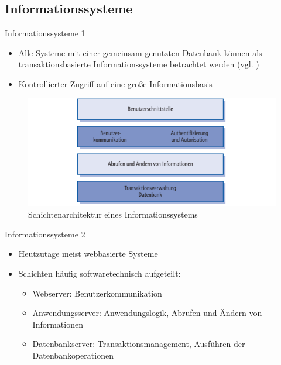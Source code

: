 \documentclass{beamer}
\begin{document}
		\subsection{Informationssysteme}
			\begin{frame}{Informationssysteme 1}
			\begin{itemize}
				\item Alle Systeme mit einer gemeinsam genutzten Datenbank können als transaktionsbasierte Informationssysteme betrachtet werden (vgl. \cite[S. 205]{sommer})
				\item Kontrollierter Zugriff auf eine große Informationsbasis
			\end{itemize}
			\begin{figure}
				\includegraphics[width=\textwidth]{informationssystem-1.png}
				\caption{Schichtenarchitektur eines Informationssystems \cite[S. 205]{sommer}}
			\end{figure}
			\end{frame}
		
			\begin{frame}{Informationssysteme 2}
			\begin{itemize}
				\item Heutzutage meist webbasierte Systeme
				\item Schichten häufig softwaretechnisch aufgeteilt:
				\begin{itemize}
					\item Webserver: Benutzerkommunikation
					\item Anwendungsserver: Anwendungslogik, Abrufen und Ändern von Informationen
					\item Datenbankserver: Transaktionsmanagement, Ausführen der Datenbankoperationen
				\end{itemize}
			\end{itemize}
			\end{frame}
			
\end{document}
